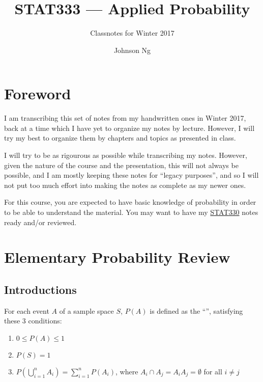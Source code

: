 \documentclass[notoc,notitlepage]{tufte-book}
\title{STAT333 --- Applied Probability}
\author{Johnson Ng}
\subtitle{Classnotes for Winter 2017}
\begin{document}


\chapter*{Foreword}%
\label{chp:foreword}

I am transcribing this set of notes from my handwritten ones in Winter 2017,
back at a time which I have yet to organize my notes by lecture. However, I will
try my best to organize them by chapters and topics as presented in class.

I will try to be as rigourous as possible while transcribing my notes. However,
given the nature of the course and the presentation, this will not always be
possible, and I am mostly keeping these notes for ``legacy purposes'', and so I
will not put too much effort into making the notes as complete as my newer
ones.

For this course, you are expected to have basic knowledge of probability in
order to be able to understand the material. You may want to have my
\href{https://tex.japorized.ink/STAT330S18/classnotes-white.pdf}{STAT330} notes
ready and/or reviewed.


\chapter{Elementary Probability Review}%
\label{chp:elementary_probability_review}

\section{Introductions}%
\label{sec:introductions}

\begin{defn}
\label{defn:fundamental_definition_of_a_probability_function}
  For each event $A$ of a sample space $S$, $P(A)$ is defined as the ``'', satisfying these 3 conditions:
  \begin{enumerate}
    \item $0 \leq P(A) \leq 1$
    \item $P(S) = 1$  \label{item:funddefn_probfn_item2}
    \item $P\left( \bigcup\limits_{i = 1}^{n} A_i \right) = \sum\limits_{i=1}^{n} P(A_i)$, where $A_i \cap A_j = A_i A_j = \emptyset$ for all $i \neq j$  \label{item:funddefn_probfn_item3}
  \end{enumerate}
\end{defn}
\end{document}
